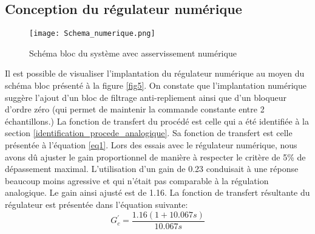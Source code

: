 \subsection{Conception du régulateur numérique}
\begin{figure}[htbp]
\centering
\texttt{[image: Schema\_numerique.png]}
\caption{Schéma bloc du système avec asservissement numérique}
\label{fig7}
\end{figure}
Il est possible de visualiser l'implantation du régulateur numérique au moyen du schéma bloc présenté à la figure \ref{fig5}. On constate que l'implantation numérique suggère l'ajout d'un bloc de filtrage anti-repliement ainsi que d'un bloqueur d'ordre zéro (qui permet de maintenir la commande constante entre 2 échantillons.) La fonction de transfert du procédé est celle qui a été identifiée à la section \ref{identification_procede_analogique}. Sa fonction de transfert est celle présentée à l'équation \ref{eq1}. Lors des essais avec le régulateur numérique, nous avons dû ajuster le gain proportionnel de manière à respecter le critère de 5\% de dépassement maximal. L'utilisation d'un gain de 0.23 conduisait à une réponse beaucoup moins agressive et qui n'était pas comparable à la régulation analogique. Le gain ainsi ajusté est de 1.16. La fonction de transfert résultante du régulateur est présentée dans l'équation suivante:
\begin{equation}
G_c^{'} = \frac{1.16(1 + 10.067s)}{10.067s}
\end{equation}
